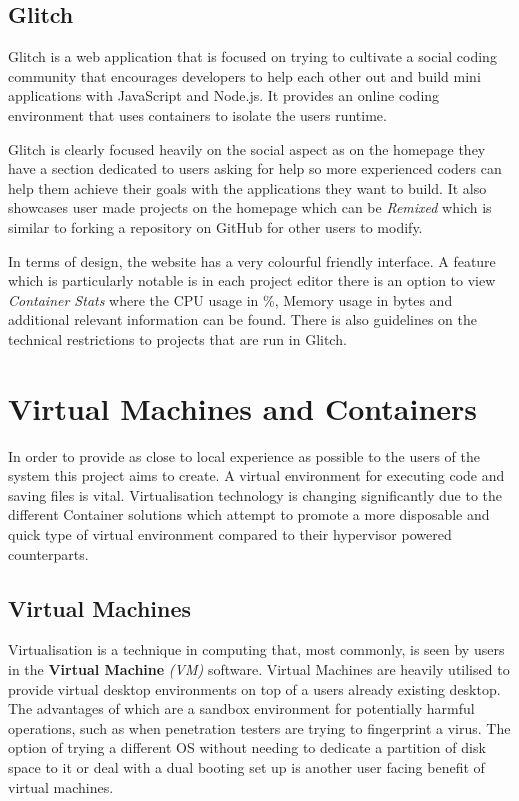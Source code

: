 \subsection{Glitch}
Glitch is a web application that is focused on trying to cultivate a social coding community that encourages developers to help each other out and build mini applications with JavaScript and Node.js. It provides an online coding environment that uses containers to isolate the users runtime.

Glitch is clearly focused heavily on the social aspect as on the homepage they have a section dedicated to users asking for help so more experienced coders can help them achieve their goals with the applications they want to build. It also showcases user made projects on the homepage which can be \textit{Remixed} which is similar to forking a repository on GitHub for other users to modify.

In terms of design, the website has a very colourful friendly interface. A feature which is particularly notable is in each project editor there is an option to view \textit{Container Stats} where the CPU usage in \%, Memory usage in bytes and additional relevant information can be found. There is also guidelines on the technical restrictions to projects that are run in Glitch. 


\section{Virtual Machines and Containers} \label{lit-containers}

In order to provide as close to local experience as possible to the users of the system this project aims to create. A virtual environment for executing code and saving files is vital. Virtualisation technology is changing significantly due to the different Container solutions which attempt to promote a more disposable and quick type of virtual environment compared to their hypervisor powered counterparts.

\subsection{Virtual Machines}

Virtualisation is a technique in computing that, most commonly, is seen by users in the \textbf{Virtual Machine} \textit{(VM)} software. Virtual Machines are heavily utilised to provide virtual desktop environments on top of a users already existing desktop. The advantages of which are a sandbox environment for potentially harmful operations, such as when penetration testers are trying to fingerprint a virus. The option of trying a different OS without needing to dedicate a partition of disk space to it or deal with a dual booting set up is another user facing benefit of virtual machines.

